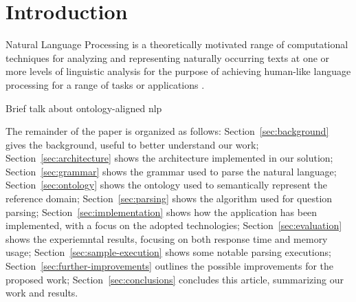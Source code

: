 \section{Introduction}
\label{sec:introduction}

Natural Language Processing is a theoretically motivated range of
computational techniques for analyzing and representing naturally occurring texts
at one or more levels of linguistic analysis for the purpose of achieving human-like
language processing for a range of tasks or applications \cite{liddy2001natural}.

Brief talk about ontology-aligned nlp\cite{cimiano2014ontology}

The remainder of the paper is organized as follows:
Section~\ref{sec:background} gives the background, useful to better understand our work;
Section~\ref{sec:architecture} shows the architecture implemented in our solution;
Section~\ref{sec:grammar} shows the grammar used to parse the natural language;
Section~\ref{sec:ontology} shows the ontology used to semantically represent the reference domain;
Section~\ref{sec:parsing} shows the algorithm used for question parsing;
Section~\ref{sec:implementation} shows how the application has been implemented, with a focus on the adopted technologies;
Section~\ref{sec:evaluation} shows the experiemntal results, focusing on both response time and memory usage;
Section~\ref{sec:sample-execution} shows some notable parsing executions;
Section~\ref{sec:further-improvements} outlines the possible improvements for the proposed work;
Section~\ref{sec:conclusions} concludes this article, summarizing our work and results.